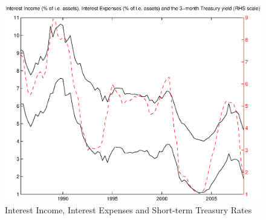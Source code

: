 \documentclass[11pt]{article}
\begin{document}
\newpage \clearpage
\begin{figure}
\caption{Interest Income, Interest Expenses and Short-term Treasury Rates} \label{figure_nims_components}
\center
\includegraphics[scale=0.85]{figure_nims_components.ps}
\end{figure}
\end{document}

